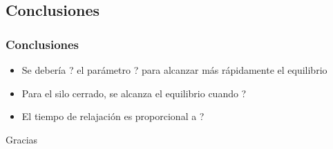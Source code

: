 \documentclass[hyperref={pdfpagelayout=SinglePage}]{beamer}
\begin{document}
\subsection{Conclusiones}

\begin{frame}
\frametitle{Conclusiones}
\begin{itemize}
	\item Se debería ? el parámetro ? para alcanzar más rápidamente el equilibrio
	\item Para el silo cerrado, se alcanza el equilibrio cuando ?
	\item El tiempo de relajación es proporcional a ?
\end{itemize}	
\end{frame} 

\begin{frame}[plain]
    \centering
	\Huge Gracias
\end{frame}
\end{document}
